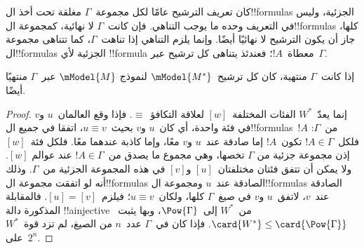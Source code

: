 \documentclass[../../../include/open-logic-section]{subfiles}
\begin{document}


كان تعريف الترشيح عامًا لكل مجموعة~$\Gamma$ مغلقة تحت أخذ ال!!{formula}s
الجزئية، وليس في التعريف وحده ما يوجب التناهي. فإن كانت~$\Gamma$
لا نهائية، كمجموعة ال!!{formula}s كلها، جاز أن يكون الترشيح لا نهائيًا
أيضًا. وإنما يلزم التناهي إذا تناهت~$\Gamma$، كما تتناهى مجموعة
ال!!{formula}s الجزئية لأي !!{formula} معطاة~$!A$؛ فعندئذ يتناهى كل
ترشيح عبر~$\Gamma$.

\begin{prop}
  إذا كانت~$\Gamma$ منتهية، كان كل ترشيح~$\mModel{M^*}$ لنموذج
  $\mModel{M}$ عبر~$\Gamma$ منتهيًا أيضًا.
\end{prop}

\begin{proof}
  إنما يعدّ~$W^*$ الفئات المختلفة~$[w]$ لعلاقة التكافؤ~$\equiv$.
  فإذا وقع العالمان~$u$ و$v$ في فئة واحدة، أي كان~$u$ و$v$
  بحيث~$u \equiv v$، اتفقا في جميع ال!!{formula}s~$!A$ من~$\Gamma$:
  فلكل~$!A \in \Gamma$ تكون~$!A$ إما صادقة عند~$u$ و$v$ معًا،
  وإما كاذبة عندهما معًا. فلكل فئة~$[w]$ إذن مجموعة جزئية من
  $\Gamma$ تخصها، وهي مجموع ما يصدق من~$!A \in \Gamma$ عند عوالم
  $[w]$. ولا يمكن أن تتفق فئتان مختلفتان~$[u]$ و$[v]$ في هذه المجموعة
  الجزئية من~$\Gamma$. وذلك أنه لو اتفقت مجموعة ال!!{formula}s الصادقة
  عند~$u$ ومجموعة ال!!{formula}s الصادقة عند~$v$، لاتفق~$u$ و$v$
  في صيغ~$\Gamma$ كلها، ولكان~$u \equiv v$؛ فيلزم~$[u]=[v]$.
  فالمقابلة المذكورة دالة !!a{injective} من~$W^*$ إلى~$\Pow{\Gamma}$،
  وبها يثبت~$\card{W^*} \le \card{\Pow{\Gamma}}$. فإذا كان في~$\Gamma$
  عدد~$n$ من الصيغ، لم تزد قوة~$W^*$ على~$2^n$.
\end{proof}
\end{document}
